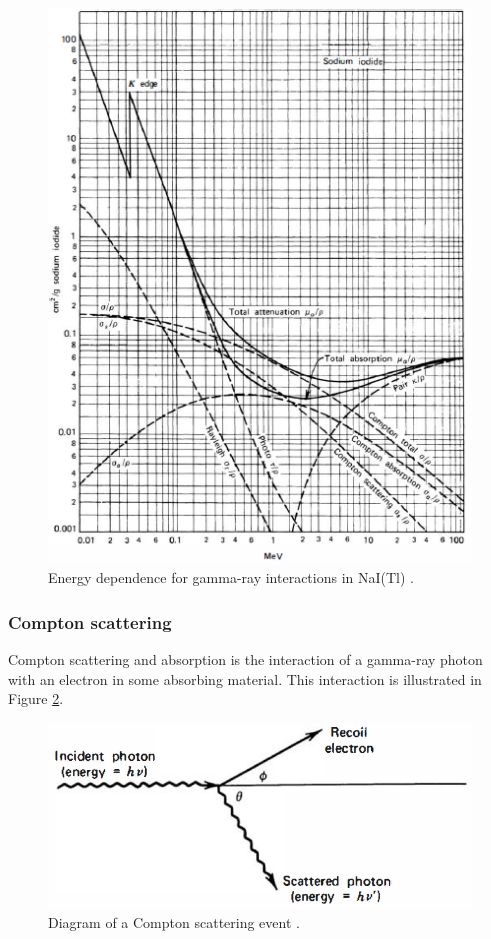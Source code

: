 \begin{figure}[H]
\centering
\includegraphics[width=0.75\linewidth]{images/energy_dependence_interactions}
\caption{Energy dependence for gamma-ray interactions in NaI(Tl) \cite{knoll}.}
\label{fig:energy_dependence_interactions}
\end{figure}

\subsubsection{Compton scattering}

Compton scattering and absorption is the interaction of a gamma-ray photon with an electron in some absorbing material. This interaction is illustrated in Figure \ref{fig:compton_scatter}. 



\begin{figure}[H]
\centering
\includegraphics[width=0.7\linewidth]{images/compton_scatter}
\caption{Diagram of a Compton scattering event \cite{knoll}.}
\label{fig:compton_scatter}
\end{figure}

